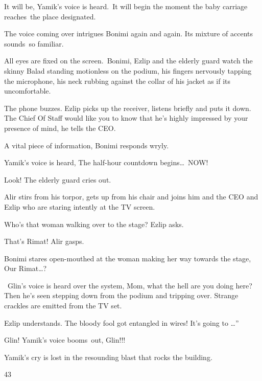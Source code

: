 \documentclass[twoside,11pt]{book}
\begin{document}
{\textquotedbl}It will be,{\textquotedbl} Yamik's voice is heard.\ {\textquotedbl}It will begin the moment the baby
carriage reaches{\ }the place designated.{\textquotedbl} 

The voice coming over intrigues Bonimi again and again. Its mixture of accents sounds\ so familiar.

All eyes are fixed on the screen.{\ }Bonimi, Ezlip and the elderly guard watch
the skinny Balad standing motionless on the podium, his fingers nervously tapping the microphone, his neck rubbing
against the collar of his jacket as if its uncomfortable.

The phone buzzes. Ezlip picks up the receiver, listens briefly and puts it down. {\textquotedbl}The Chief Of Staff would
like you to know that he's highly impressed by your presence of mind,{\textquotedbl} he tells the CEO.

{\textquotedbl}A vital piece of information,{\textquotedbl} Bonimi responds wryly. 

Yamik's voice is heard, {\textquotedbl}The half-hour countdown
begins{\dots}{\ }NOW!{\textquotedbl}

{\textquotedbl}Look!{\textquotedbl} The elderly guard cries out.

Alir stirs from his torpor, gets up from his chair and joins him and the CEO and Ezlip who are staring intently at the
TV screen. 

{\textquotedbl}Who's that woman walking over to the stage?{\textquotedbl} Ezlip asks. 

{\textquotedbl}That's Rimat!{\textquotedbl} Alir gasps. 

Bonimi stares open-mouthed at the woman making her way towards the stage, {\textquotedbl}Our
Rimat{\dots}?{\textquotedbl}

~Glin's voice is heard over the system, {\textquotedbl}Mom, what the hell are you doing here?{\textquotedbl} Then
he{{}'}s seen stepping down from the podium and tripping over. Strange crackles
are emitted from the TV set.

Ezlip understands. {\textquotedbl}The bloody fool got entangled in wires! It's going to {\dots}''

{\textquotedbl}Glin!{\textquotedbl} Yamik's voice booms{\ }out,
{\textquotedbl}Glin!!!{\textquotedbl}

Yamik's cry is lost in the resounding blast that rocks the building.


\bigskip

43\ 
\end{document}
